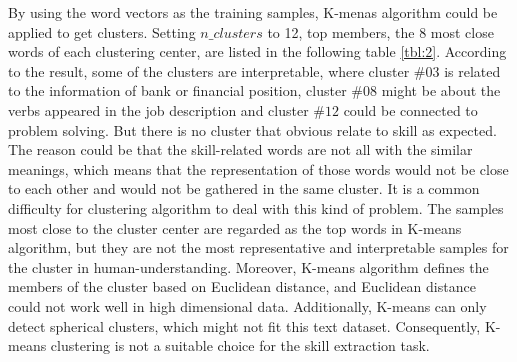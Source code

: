 By using the word vectors as the training samples, K-menas algorithm could be applied to get clusters. Setting $n\_clusters$ to 12, top members, the 8 most close words of each clustering center, are listed in the following table \ref{tbl:2}. According to the result, some of the clusters are interpretable, where cluster $\#03$ is related to the information of bank or financial position, cluster $\#08$ might be about the verbs appeared in the job description and cluster $\#12$ could be connected to problem solving. But there is no cluster that obvious relate to skill as expected. The reason could be that the skill-related words are not all with the similar meanings, which means that the representation of those words would not be close to each other and would not be gathered in the same cluster. It is a common difficulty for clustering algorithm to deal with this kind of problem. The samples most close to the cluster center are regarded as the top words in K-means algorithm, but they are not the most representative and interpretable samples for the cluster in human-understanding. Moreover, K-means algorithm defines the members of the cluster based on Euclidean distance, and Euclidean distance could not work well in high dimensional data. Additionally, K-means can only detect spherical clusters, which might not fit this text dataset. Consequently, K-means clustering is not a suitable choice for the skill extraction task.



